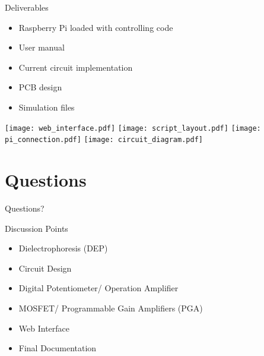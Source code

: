 \begin{frame}{Deliverables}
\begin{block}{} 
  \begin{itemize}
    \item Raspberry Pi loaded with controlling code
    \item User manual
    \item Current circuit implementation
    \item PCB design
    \item Simulation files
  \end{itemize}
\end{block}

\begin{multicols}{4}

\texttt{[image: web\_interface.pdf]}
\texttt{[image: script\_layout.pdf]}
\texttt{[image: pi\_connection.pdf]}
\texttt{[image: circuit\_diagram.pdf]}

\end{multicols}
\end{frame}

\section{Questions}

\begin{frame}{Questions?}
\begin{block}{Discussion Points}
  \begin{itemize}
    \item Dielectrophoresis (DEP)
    \item Circuit Design
    \item Digital Potentiometer/ Operation Amplifier
    \item MOSFET/ Programmable Gain Amplifiers (PGA)
    \item Web Interface
    \item Final Documentation
  \end{itemize}
\end{block}
\end{frame}

